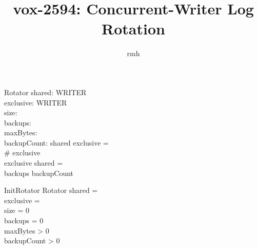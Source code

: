 \documentclass{article}
\begin{document}
\title{vox-2594: Concurrent-Writer Log Rotation}
\author{rmh}
\maketitle

\begin{zed}
  [WRITER]
\end{zed}

%
\begin{schema}{Rotator}
  shared: \power WRITER \\
  exclusive: \power WRITER \\
  size: \nat \\
  backups: \nat \\
  maxBytes: \nat \\
  backupCount: \nat
\where
  shared \cap exclusive = \emptyset \\
  \# exclusive  \\
  exclusive \neq \emptyset \implies shared = \emptyset \\
  backups \leq backupCount
\end{schema}

\begin{schema}{InitRotator}
  Rotator
\where
  shared = \emptyset \\
  exclusive = \emptyset \\
  size = 0 \\
  backups = 0 \\
  maxBytes > 0 \\
  backupCount > 0
\end{schema}
\end{document}
